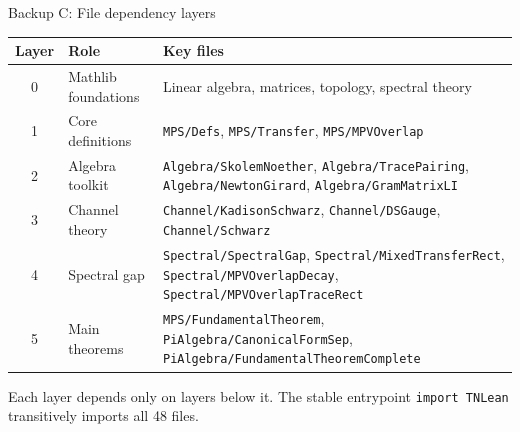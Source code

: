 \documentclass[aspectratio=169,10pt]{beamer}
\begin{document}
\begin{frame}{Backup C: File dependency layers}
    \vspace{-0.6em}

    \renewcommand{\arraystretch}{1.15}
    {\footnotesize
        \begin{tabular}{c p{} p{}}
            \toprule
            \textbf{Layer} & \textbf{Role}       & \textbf{Key files}                                                                                                                           \\
            \midrule
            \rowcolor{cardbg}
            0              & Mathlib foundations & Linear algebra, matrices, topology, spectral theory                                                                                          \\
            \rowcolor{cardbg}
            1              & Core definitions    & \texttt{MPS/Defs}, \texttt{MPS/Transfer}, \texttt{MPS/MPVOverlap}                                                                            \\
            \rowcolor{cardbg}
            2              & Algebra toolkit     & \texttt{Algebra/SkolemNoether}, \texttt{Algebra/TracePairing}, \texttt{Algebra/NewtonGirard}, \texttt{Algebra/GramMatrixLI}                  \\
            \rowcolor{cardbg}
            3              & Channel theory      & \texttt{Channel/KadisonSchwarz}, \texttt{Channel/DSGauge}, \texttt{Channel/Schwarz}                                                          \\
            \rowcolor{cardbg}
            4              & Spectral gap        & \texttt{Spectral/SpectralGap}, \texttt{Spectral/MixedTransferRect}, \texttt{Spectral/MPVOverlapDecay}, \texttt{Spectral/MPVOverlapTraceRect} \\
            \rowcolor{cardbg}
            5              & Main theorems       & \texttt{MPS/FundamentalTheorem}, \texttt{PiAlgebra/CanonicalFormSep}, \texttt{PiAlgebra/FundamentalTheoremComplete}                          \\
            \bottomrule
        \end{tabular}
    }

    \vspace{0.3em}
    \textcolor{dimwhite}{\footnotesize Each layer depends only on layers below it.
        The stable entrypoint \texttt{import TNLean} transitively imports all 48 files.}
\end{frame}
\end{document}
